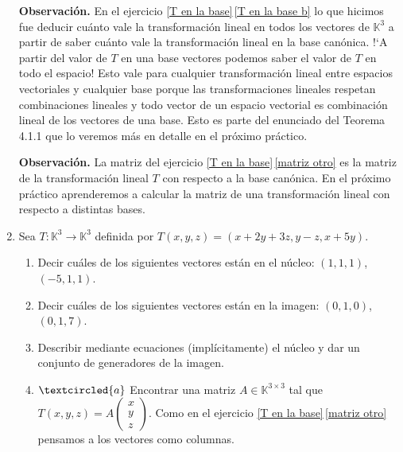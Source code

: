 \begin{enumerate}[topsep=6pt, itemsep=.4cm]
\textbf{Observación.} 
En el ejercicio \ref{T en la base}\,\ref{T en la base b} lo que hicimos fue deducir cuánto vale la transformación lineal en todos los vectores de $\mathbb{K}^3$ a partir de saber cuánto vale la transformación lineal en la base canónica. !`A partir del valor de $T$ en una base vectores podemos saber el valor de $T$ en todo el espacio! Esto vale para cualquier transformación lineal entre espacios vectoriales y cualquier base porque las transformaciones lineales respetan combinaciones lineales y todo vector de un espacio vectorial es combinación lineal de los vectores de una base. Esto es parte del enunciado del Teorema 4.1.1 que lo veremos más en detalle en el próximo práctico.

\textbf{Observación.} La matriz del ejercicio  \ref{T en la base}\,\ref{matriz otro} es la matriz de la transformación lineal $T$ con respecto a la base canónica. En el próximo práctico aprenderemos a calcular la matriz de una transformación lineal 
    con respecto a distintas bases.

    
\item\label{Txyz} Sea $T:\mathbb{K}^3\longrightarrow\mathbb{K}^3$ definida por $T(x,y,z)=(x+2y+3z, y-z,x+5y)$.
\begin{enumerate}
\item Decir cuáles de los siguientes vectores están en el núcleo: $(1,1,1)$, $(-5,1,1)$.
\item Decir cuáles de los siguientes vectores están en la imagen: $(0,1,0)$, $(0,1,7)$.
 \item\label{Txyz nucleo} Describir mediante ecuaciones (implícitamente) el núcleo y dar un conjunto de generadores de la imagen.
 \item\label{matriz} $\textcircled{a}$ Encontrar una matriz  $A\in\mathbb{K}^{3\times 3}$ tal que $T(x,y,z)=A\left(\begin{matrix}
    x\\y\\z \end{matrix}
    \right)$.  Como en el ejercicio  \ref{T en la base}\,\ref{matriz otro} pensamos a los vectores como columnas.
\end{enumerate}



\end{enumerate}

